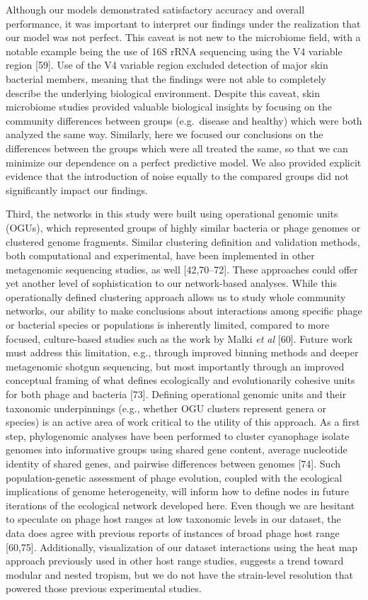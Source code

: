 \documentclass[12pt,]{article}
\begin{document}
Although our models demonstrated satisfactory accuracy and overall
performance, it was important to interpret our findings under the
realization that our model was not perfect. This caveat is not new to
the microbiome field, with a notable example being the use of 16S rRNA
sequencing using the V4 variable region {[}59{]}. Use of the V4 variable
region excluded detection of major skin bacterial members, meaning that
the findings were not able to completely describe the underlying
biological environment. Despite this caveat, skin microbiome studies
provided valuable biological insights by focusing on the community
differences between groups (e.g.~disease and healthy) which were both
analyzed the same way. Similarly, here we focused our conclusions on the
differences between the groups which were all treated the same, so that
we can minimize our dependence on a perfect predictive model. We also
provided explicit evidence that the introduction of noise equally to the
compared groups did not significantly impact our findings.

Third, the networks in this study were built using operational genomic
units (OGUs), which represented groups of highly similar bacteria or
phage genomes or clustered genome fragments. Similar clustering
definition and validation methods, both computational and experimental,
have been implemented in other metagenomic sequencing studies, as well
{[}42,70--72{]}. These approaches could offer yet another level of
sophistication to our network-based analyses. While this operationally
defined clustering approach allows us to study whole community networks,
our ability to make conclusions about interactions among specific phage
or bacterial species or populations is inherently limited, compared to
more focused, culture-based studies such as the work by Malki \emph{et
al} {[}60{]}. Future work must address this limitation, e.g., through
improved binning methods and deeper metagenomic shotgun sequencing, but
most importantly through an improved conceptual framing of what defines
ecologically and evolutionarily cohesive units for both phage and
bacteria {[}73{]}. Defining operational genomic units and their
taxonomic underpinnings (e.g., whether OGU clusters represent genera or
species) is an active area of work critical to the utility of this
approach. As a first step, phylogenomic analyses have been performed to
cluster cyanophage isolate genomes into informative groups using shared
gene content, average nucleotide identity of shared genes, and pairwise
differences between genomes {[}74{]}. Such population-genetic assessment
of phage evolution, coupled with the ecological implications of genome
heterogeneity, will inform how to define nodes in future iterations of
the ecological network developed here. Even though we are hesitant to
speculate on phage host ranges at low taxonomic levels in our dataset,
the data does agree with previous reports of instances of broad phage
host range {[}60,75{]}. Additionally, visualization of our dataset
interactions using the heat map approach previously used in other host
range studies, suggests a trend toward modular and nested tropism, but
we do not have the strain-level resolution that powered those previous
experimental studies.
\end{document}
